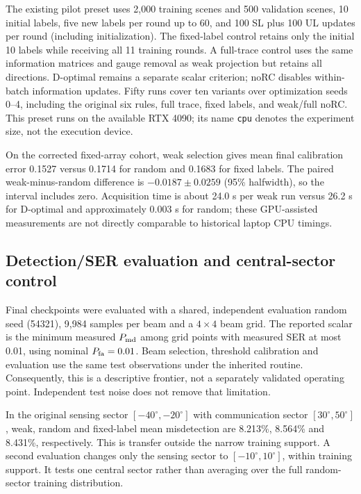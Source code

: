 \documentclass[conference]{IEEEtran}
\begin{document}
The existing pilot preset uses 2,000 training scenes and 500 validation scenes, 10 initial labels, five new labels per round up to 60, and 100 SL plus 100 UL updates per round (including initialization). The fixed-label control retains only the initial 10 labels while receiving all 11 training rounds. A full-trace control uses the same information matrices and gauge removal as weak projection but retains all directions. D-optimal remains a separate scalar criterion; noRC disables within-batch information updates. Fifty runs cover ten variants over optimization seeds 0--4, including the original six rules, full trace, fixed labels, and weak/full noRC. This preset runs on the available RTX 4090; its name \texttt{cpu} denotes the experiment size, not the execution device.

On the corrected fixed-array cohort, weak selection gives mean final calibration error 0.1527 versus 0.1714 for random and 0.1683 for fixed labels. The paired weak-minus-random difference is $-0.0187\pm0.0259$ (95\% halfwidth), so the interval includes zero. Acquisition time is about 24.0 s per weak run versus 26.2 s for D-optimal and approximately 0.003 s for random; these GPU-assisted measurements are not directly comparable to historical laptop CPU timings.

\subsection{Detection/SER evaluation and central-sector control}
Final checkpoints were evaluated with a shared, independent evaluation random seed (54321), 9,984 samples per beam and a $4\times4$ beam grid. The reported scalar is the minimum measured $P_{\rm md}$ among grid points with measured SER at most 0.01, using nominal $P_{\rm fa}=0.01$. Beam selection, threshold calibration and evaluation use the same test observations under the inherited routine. Consequently, this is a descriptive frontier, not a separately validated operating point. Independent test noise does not remove that limitation.

In the original sensing sector $[-40^\circ,-20^\circ]$ with communication sector $[30^\circ,50^\circ]$, weak, random and fixed-label mean misdetection are 8.213\%, 8.564\% and 8.431\%, respectively. This is transfer outside the narrow training support. A second evaluation changes only the sensing sector to $[-10^\circ,10^\circ]$, within training support. It tests one central sector rather than averaging over the full random-sector training distribution.
\end{document}
